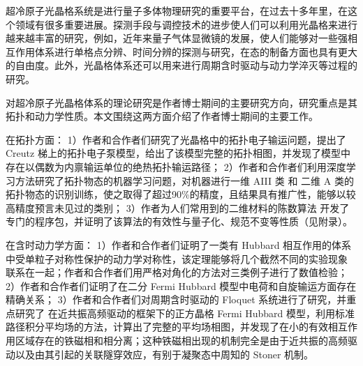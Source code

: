 \begin{cabstract}
超冷原子光晶格系统是进行量子多体物理研究的重要平台，在过去十多年里，在这个领域有很多重要进展。探测手段与调控技术的进步使人们可以利用光晶格来进行越来越丰富的研究，例如，近年来量子气体显微镜的发展，使人们能够对一些强相互作用体系进行单格点分辨、时间分辨的探测与研究，在态的制备方面也具有更大的自由度。此外，光晶格体系还可以用来进行周期含时驱动与动力学淬灭等过程的研究。

对超冷原子光晶格体系的理论研究是作者博士期间的主要研究方向，研究重点是其拓扑和动力学性质。本文围绕这两方面介绍了作者博士期间的主要工作。

在拓扑方面：
1）作者和合作者们研究了光晶格中的拓扑电子输运问题，提出了 Creutz 梯上的拓扑电子泵模型，给出了该模型完整的拓扑相图，并发现了模型中存在以偶数为内禀输运单位的绝热拓扑输运路径；
2）作者和合作者们利用深度学习方法研究了拓扑物态的机器学习问题，对机器进行一维 AIII 类 和 二维 A 类的拓扑物态的识别训练，使之取得了超过90\%的精度，且结果具有推广性，能够以较高精度预言未见过的类别；
3）作者为人们常用到的二维材料的陈数算法%
开发了专门的程序包，并证明了该算法的有效性与量子化、规范不变等性质（见附录）。

在含时动力学方面：
1）作者和合作者们证明了一类有 Hubbard 相互作用的体系中受单粒子对称性保护的动力学对称性，该定理能够将几个截然不同的实验现象
联系在一起；作者和合作者们用严格对角化的方法对三类例子进行了数值检验；
2）作者和合作者们证明了在二分 Fermi Hubbard 模型中电荷和自旋输运方面存在精确关系；
3）作者和合作者们对周期含时驱动的 Floquet 系统进行了研究，并重点研究了
在近共振高频驱动的框架下的正方晶格 Fermi Hubbard 模型，利用标准路径积分平均场的方法，计算出了完整的平均场相图，并发现了在小的有效相互作用区域存在的铁磁相和相分离；这种铁磁相出现的机制完全是由于近共振的高频驱动以及由其引起的关联隧穿效应，有别于凝聚态中周知的 Stoner 机制。
\end{cabstract}

